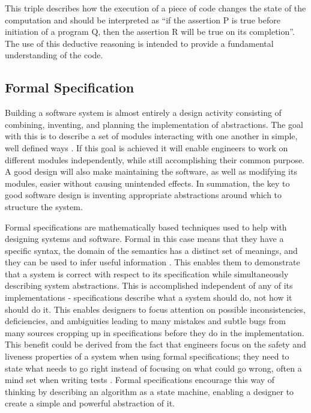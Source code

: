                         
This triple describes how the execution of a piece of code changes the state of the computation and should be interpreted as “if the assertion P is true before initiation of a program Q, then the assertion R will be true on its completion”. The use of this deductive reasoning is intended to provide a fundamental understanding of the code. 

\subsection{Formal Specification}\label{formalspec}


Building a software system is almost entirely a design activity consisting of combining, inventing, and planning the implementation of abstractions. The goal with this is to describe a set of modules interacting with one another in simple, well defined ways \cite{Larch}. If this goal is achieved it will enable engineers to work on different modules independently, while still accomplishing their common purpose. A good design will also make maintaining the software, as well as modifying its modules, easier without causing unintended effects. In summation, the key to good software design is inventing appropriate abstractions around which to structure the system.


Formal specifications are mathematically based techniques used to help with designing systems and software. Formal in this case means that they have a specific syntax, the domain of the semantics has a distinct set of meanings, and they can be used to infer useful information \cite{FORMALSPECROADMAP}. This enables them to demonstrate that a system is correct with respect to its specification while simultaneously describing system abstractions. This is accomplished independent of any of its implementations - specifications describe what a system should do, not how it should do it. This enables designers to focus attention on possible inconsistencies, deficiencies, and ambiguities leading to many mistakes and subtle bugs from many sources cropping up in specifications before they do in the implementation. This benefit could be derived from the fact that engineers focus on the safety and liveness properties of a system when using formal specifications; they need to state what needs to go right instead of focusing on what could go wrong, often a mind set when writing tests \cite{AMAZONFORMALSPEC}. Formal specifications encourage this way of thinking by describing an algorithm as a state machine, enabling a designer to create a simple and powerful abstraction of it.

